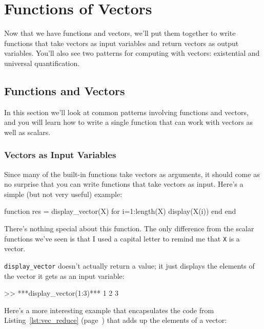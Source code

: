 \chapter{Functions of Vectors}

Now that we have functions and vectors, we'll put them together to write functions that take vectors as input variables and return vectors as output variables.  You'll also see two patterns for computing with vectors: existential and universal quantification.


\section{Functions and Vectors}

In this section we'll look at common patterns involving functions and vectors, and you will learn how to write a single function that can work with vectors as well as scalars.

\subsection{Vectors as Input Variables}

Since many of the built-in functions take vectors as arguments,
it should come as no surprise that you can write functions that
take vectors as input.  Here's a simple (but not very useful) example:


\begin{code}
function res = display_vector(X)
    for i=1:length(X)
        display(X(i))
    end
end
\end{code}

There's nothing special about this function.  The only
difference from the scalar functions we've seen is that I used
a capital letter to remind me that {\tt X} is a vector.

\verb"display_vector" doesn't actually return a value; it just displays the elements of the vector it gets as an input variable:

\begin{code}
>> ***display_vector(1:3)***
    1
    2
    3
\end{code}

Here's a more interesting example that encapsulates the code
from Listing~\ref{lst:vec_reduce} (page~\pageref{lst:vec_reduce}) that adds up the elements of a vector:


